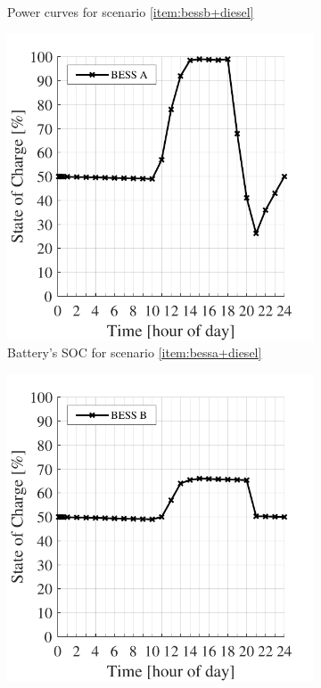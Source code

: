 \documentclass{ieeeaccess}
\begin{document}
\begin{figure}[!h]
\begin{subfigure}{.235\textwidth}
            \caption{Power curves for scenario \ref{item:bessb+diesel} }
            \label{fig:result-power-B}
        \end{subfigure}

        \begin{subfigure}{.235\textwidth}
            \centering
            \includegraphics[width=\linewidth]{figures/residential_nv14_soc.pdf}
            \caption{Battery's \ac{SOC} for scenario \ref{item:bessa+diesel}}
            \label{fig:result-soc-A}
        \end{subfigure}
        \begin{subfigure}{.235\textwidth}
            \centering
            \includegraphics[width=\linewidth]{figures/residential_8ch33p_soc.pdf}

\end{subfigure}
\end{figure}
\end{document}

